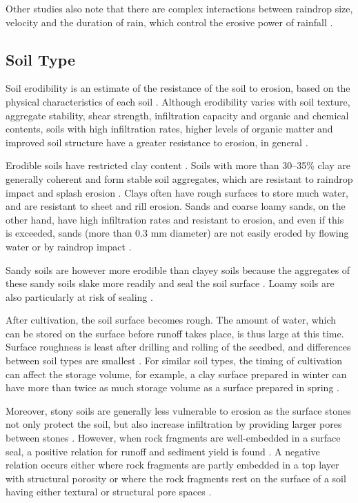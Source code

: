 Other studies also note that there are complex interactions between raindrop
size, velocity and the duration of rain, which control the erosive power of
rainfall \citep{kinnell1981-153,brandt1990-687,salles1999-545,vandijk2002-1}.

\subsection{Soil Type}
\label{sec:SoilType}

Soil erodibility is an estimate of the resistance of the soil to erosion, based
on the physical characteristics of each soil \citep{morgan1995-soil}. Although
erodibility varies with soil texture, aggregate stability, shear strength,
infiltration capacity and organic and chemical contents, soils with high
infiltration rates, higher levels of organic matter and improved soil structure
have a greater resistance to erosion, in general \citep{morgan1995-soil}.

Erodible soils have restricted clay content \citep{bryan2000-385}. Soils with
more than 30--35\% clay are generally coherent and form stable soil aggregates,
which are resistant to raindrop impact and splash erosion
\citep{evans1980-mechanics}. Clays often have rough surfaces to store much
water, and are resistant to sheet and rill erosion. Sands and coarse loamy
sands, on the other hand, have high infiltration rates and resistant to erosion,
and even if this is exceeded, sands (more than 0.3 mm diameter) are not easily
eroded by flowing water or by raindrop impact
\citep{evans1980-mechanics,marshall1996-soil}.

Sandy soils are however more erodible than clayey soils because the aggregates
of these sandy soils slake more readily and seal the soil surface
\citep{lebissonnais1996-425}. Loamy soils are also particularly at risk of
sealing \citep{ramos2000-398}.

After cultivation, the soil surface becomes rough. The amount of water, which
can be stored on the surface before runoff takes place, is thus large at this
time. Surface roughness is least after drilling and rolling of the seedbed, and
differences between soil types are smallest \citep{robinson1992-151}. For
similar soil types, the timing of cultivation can affect the storage volume, for
example, a clay surface prepared in winter can have more than twice as much
storage volume as a surface prepared in spring \citep{evans1980-mechanics}.

Moreover, stony soils are generally less vulnerable to erosion as the surface
stones not only protect the soil, but also increase infiltration by providing
larger pores between stones
\citep{agassi1991-565,poesen1994-1,defigueiredo1998-81}. However, when rock
fragments are well-embedded in a surface seal, a positive relation for runoff
and sediment yield is found \citep{poesen1992-451}. A negative relation occurs
either where rock fragments are partly embedded in a top layer with structural
porosity or where the rock fragments rest on the surface of a soil having either
textural or structural pore spaces \citep{poesen1992-451}.

